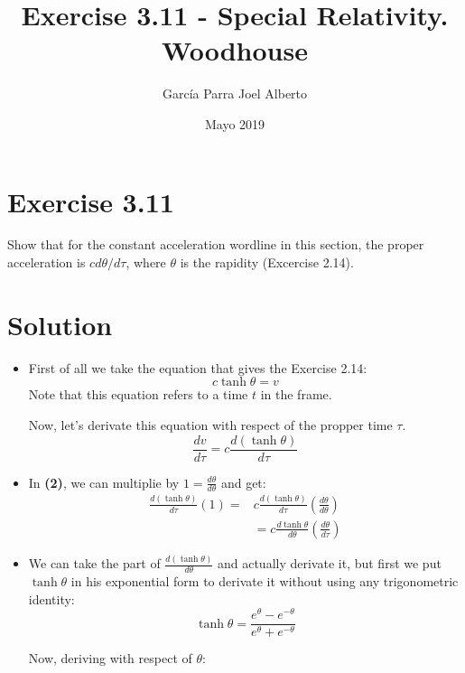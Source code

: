 \documentclass[0pt, letterpaper]{article}
\title{Exercise 3.11 - Special Relativity. Woodhouse}
\author{García Parra Joel Alberto}
\date{Mayo 2019}
\begin{document}
\maketitle

\section{Exercise 3.11}
Show that for the constant acceleration wordline in this section, the proper acceleration is $cd\theta/d\tau$, where $\theta$ is the rapidity (Excercise 2.14).
\section{Solution}
\begin{itemize}
    \item First of all we take the equation that gives the Exercise 2.14: 
        \begin{equation}
            c\tanh{\theta}=v
        \end{equation}
    Note that this equation refers to a time $t$ in the frame.
    \par Now, let's derivate this equation with respect of the propper time $\tau$.
        \begin{equation}
            \frac{dv}{d\tau} = c\frac{d(\tanh{\theta})}{d\tau}
        \end{equation}
    \item In \textbf{(2)}, we can multiplie by $1=\frac{d\theta}{d\theta}$ and get:
        \begin{equation}
        \begin{split}
            \frac{d(\tanh{\theta})}{d\tau}(1)= & c\frac{d(\tanh{\theta})}{d\tau}\left(\frac{d\theta}{d\theta}\right)\\
            & = c\frac{d\tanh{\theta}}{d\theta}\left(\frac{d\theta}{d\tau}\right)
        \end{split}
        \end{equation}
    \item We can take the part of $\frac{d(\tanh{\theta})}{d\theta}$ and actually derivate it, but first we put $\tanh{\theta}$ in his exponential form to derivate it without using any trigonometric identity:
        \begin{equation}
            \tanh{\theta} = \frac{e^{\theta}-e^{-\theta}}{e^{\theta}+e^{-\theta}}
        \end{equation}
    \par Now, deriving with respect of $\theta$:

\end{itemize}
\end{document}
